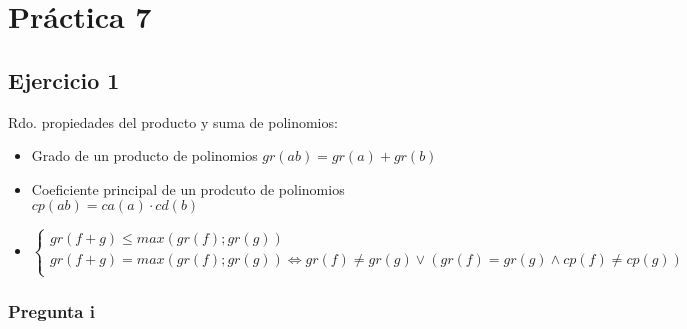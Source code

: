 
\usepackage{caratula}
\usepackage{enumerate}
\usepackage{hyperref}
\usepackage{graphicx}
\usepackage{amsfonts}
\usepackage{enumitem}
\usepackage{amsmath}

\decimalpoint
\hypersetup{colorlinks=true, linkcolor=black, urlcolor=blue}
\setlength{\parindent}{0em}
\setlength{\parskip}{0.5em}
\setcounter{tocdepth}{2} %
\setcounter{section}{6} %
\renewcommand{\thesubsubsection}{\thesubsection.\Alph{subsubsection}}
\graphicspath{ {images/} }





\maketitle
\newpage

\tableofcontents
\newpage

\section{Práctica 7}

\subsection{Ejercicio 1}

Rdo. propiedades del producto y suma de polinomios: 
\begin{itemize}
    \item Grado de un producto de polinomios $ gr(ab) = gr(a) + gr(b) $
    \item Coeficiente principal de un prodcuto de polinomios $ cp(ab) = ca(a)\cdot cd(b) $
    \item $ \begin{cases}
        gr(f+g) \leq max(gr(f); gr(g)) \\
        gr(f+g) = max(gr(f); gr(g)) \iff gr(f) \neq gr(g) \vee (gr(f) = gr(g) \wedge cp(f) \neq cp(g))\\
    \end{cases}  $
\end{itemize}

\subsubsection{Pregunta i}

